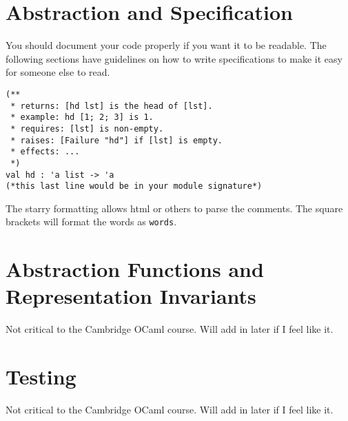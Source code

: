\documentclass[12pt,a4paper]{article} %
\begin{document}
\section{Abstraction and Specification}
You should document your code properly if you want it to be readable. The following sections have guidelines on how to write specifications to make it easy for someone else to read.
\begin{lstlisting}[language=caml]
(**
 * returns: [hd lst] is the head of [lst].
 * example: hd [1; 2; 3] is 1.
 * requires: [lst] is non-empty.
 * raises: [Failure "hd"] if [lst] is empty.
 * effects: ...
 *)
val hd : 'a list -> 'a
(*this last line would be in your module signature*)
\end{lstlisting}
The starry formatting allows html or others to parse the comments. The square brackets will format the words as \verb|words|.
\section{Abstraction Functions and Representation Invariants}
Not critical to the Cambridge OCaml course. Will add in later if I feel like it.
\section{Testing}
Not critical to the Cambridge OCaml course. Will add in later if I feel like it.
\end{document}
